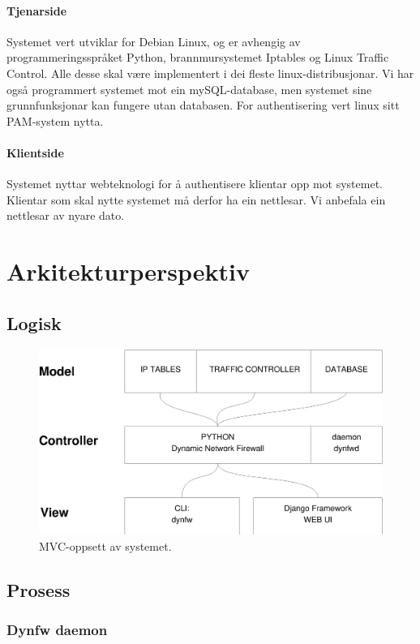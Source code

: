 \documentclass[nynorsk,12pt,a4paper]{article}
\begin{document}
\paragraph{Tjenarside}
Systemet vert utviklar for Debian Linux, og er avhengig av programmeringsspråket Python, brannmursystemet Iptables og Linux Traffic Control. Alle desse skal være implementert i dei fleste linux-distribusjonar. Vi har også programmert systemet mot ein mySQL-database, men systemet sine grunnfunksjonar kan fungere utan databasen. For authentisering vert linux sitt PAM-system nytta.
\paragraph{Klientside}
Systemet nyttar webteknologi for å authentisere klientar opp mot systemet. Klientar som skal nytte systemet må derfor ha ein nettlesar. Vi anbefala ein nettlesar av nyare dato.
 
\newpage
\section{Arkitekturperspektiv}
\subsection{Logisk}
\begin{figure}[h!]
	\centering
	\includegraphics[scale=0.5]{imgs/logisk.eps}
	\caption{MVC-oppsett av systemet.}
	\label{fig:MVC}
\end{figure}

\newpage
\subsection{Prosess}
\subsubsection{Dynfw daemon}
\end{document}
